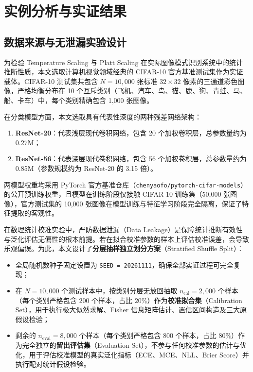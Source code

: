 \section{实例分析与实证结果}\label{sec:empirical}

\subsection{数据来源与无泄漏实验设计}

为检验 Temperature Scaling 与 Platt Scaling 在实际图像模式识别系统中的统计推断性质，本文选取计算机视觉领域经典的 CIFAR-10 官方基准测试集作为实证载体。CIFAR-10 测试集共包含 $N = 10{,}000$ 张标准 $32 \times 32$ 像素的三通道彩色图像，严格均衡分布在 10 个互斥类别（飞机、汽车、鸟、猫、鹿、狗、青蛙、马、船、卡车）中，每个类别精确包含 1,000 张图像。

在分类模型方面，本文选取具有代表性深度的两种残差网络架构：
\begin{enumerate}
\item \textbf{ResNet-20}：代表浅层现代卷积网络，包含 20 个加权卷积层，总参数量约为 0.27M；
\item \textbf{ResNet-56}：代表深层现代卷积网络，包含 56 个加权卷积层，总参数量约为 0.85M（参数规模约为 ResNet-20 的 3.15 倍）。
\end{enumerate}
两模型权重均采用 PyTorch 官方基准仓库（\texttt{chenyaofo/pytorch-cifar-models}）的公开预训练权重，且模型在训练阶段仅接触 CIFAR-10 训练集（50,000 张图像），官方测试集的 10,000 张图像在模型训练与特征学习阶段完全隔离，保证了特征提取的客观性。

在数理统计校准实验中，严防数据泄漏（Data Leakage）是保障统计推断有效性与泛化评估无偏性的根本前提。若在拟合校准参数的样本上评估校准误差，会导致乐观偏误。为此，本文设计了\textbf{分层抽样独立划分方案}（Stratified Shuffle Split）：
\begin{itemize}
\item 全局随机数种子固定设置为 \texttt{SEED = 20261111}，确保全部实证过程可完全复现；
\item 在 $N = 10{,}000$ 个测试样本中，按类别分层无放回抽取 $n_{\mathrm{cal}} = 2{,}000$ 个样本（每个类别严格包含 200 个样本，占比 $20\%$）作为\textbf{校准拟合集}（Calibration Set），用于执行极大似然求解、Fisher 信息矩阵估计、置信区间构造及三大原假设检验；
\item 剩余的 $n_{\mathrm{eval}} = 8{,}000$ 个样本（每个类别严格包含 800 个样本，占比 $80\%$）作为完全独立的\textbf{留出评估集}（Evaluation Set），不参与任何校准参数的估计与优化，用于评估校准模型的真实泛化指标（ECE、MCE、NLL、Brier Score）并执行配对统计假设检验。
\end{itemize}

